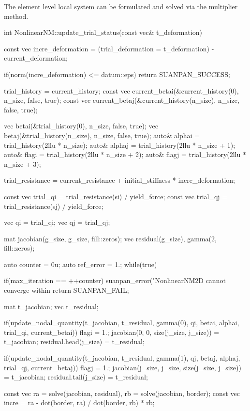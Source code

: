 The element level local system can be formulated and solved via the multiplier method.
\begin{cppcode}
int NonlinearNM::update_trial_status(const vec& t_deformation) {
    const vec incre_deformation = (trial_deformation = t_deformation) - current_deformation;

    if(norm(incre_deformation) <= datum::eps) return SUANPAN_SUCCESS;

    trial_history = current_history;
    const vec current_betai(&current_history(0), n_size, false, true);
    const vec current_betaj(&current_history(n_size), n_size, false, true);

    vec betai(&trial_history(0), n_size, false, true);
    vec betaj(&trial_history(n_size), n_size, false, true);
    auto& alphai = trial_history(2llu * n_size);
    auto& alphaj = trial_history(2llu * n_size + 1);
    auto& flagi = trial_history(2llu * n_size + 2);
    auto& flagj = trial_history(2llu * n_size + 3);

    trial_resistance = current_resistance + initial_stiffness * incre_deformation;

    const vec trial_qi = trial_resistance(si) / yield_force;
    const vec trial_qj = trial_resistance(sj) / yield_force;

    vec qi = trial_qi;
    vec qj = trial_qj;

    mat jacobian(g_size, g_size, fill::zeros);
    vec residual(g_size), gamma(2, fill::zeros);

    auto counter = 0u;
    auto ref_error = 1.;
    while(true) {
        if(max_iteration == ++counter) {
            suanpan_error("NonlinearNM2D cannot converge within %
            return SUANPAN_FAIL;
        }

        mat t_jacobian;
        vec t_residual;

        if(update_nodal_quantity(t_jacobian, t_residual, gamma(0), qi, betai, alphai, trial_qi, current_betai)) flagi = 1.;
        jacobian(0, 0, size(j_size, j_size)) = t_jacobian;
        residual.head(j_size) = t_residual;

        if(update_nodal_quantity(t_jacobian, t_residual, gamma(1), qj, betaj, alphaj, trial_qj, current_betaj)) flagj = 1.;
        jacobian(j_size, j_size, size(j_size, j_size)) = t_jacobian;
        residual.tail(j_size) = t_residual;

        const vec ra = solve(jacobian, residual), rb = solve(jacobian, border);
        const vec incre = ra - dot(border, ra) / dot(border, rb) * rb;

}}
\end{cppcode}
